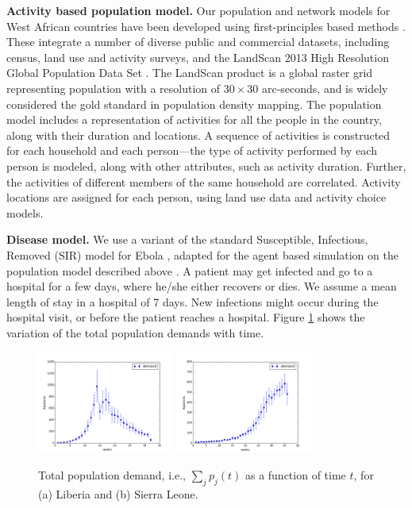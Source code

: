 \noindent
\textbf{Activity based population model.}
Our population and network models for West African countries
have been developed using first-principles based methods \cite{barrett:wsc09,eubank:nature04}.
These integrate a number of diverse public and commercial datasets, including census, 
land use and activity surveys, and the LandScan 2013 High Resolution Global Population Data Set \cite{LandScan}.
The LandScan product is a global raster grid representing population with a resolution of 
$30 \times 30$ arc-seconds, and is widely considered the gold standard in population density mapping. 
The population model includes a representation of activities for all the people in the country,
along with their duration and locations. 
A sequence of activities is constructed for each household and each person---the type of activity 
performed by each person is modeled, along with other attributes,
such as activity duration. Further, the activities of different members of the same household are correlated.
Activity locations are assigned for each person, using land use data and activity choice models.

\noindent
\textbf{Disease model.}
We use a variant of the standard Susceptible, Infectious, Removed (SIR) model for 
Ebola \cite{legrand_grais_boelle_valleron_flahault_2007}, adapted for the 
agent based simulation on the population model described above \cite{rivers:2014ea}.
A patient may get infected and go to a hospital for a few days, where he/she either recovers or dies.
We assume a mean length of stay in a hospital of 7 days. New infections might occur during
the hospital visit, or before the patient reaches a hospital. 
Figure \ref{fig:demand-dist} shows the variation of the total population demands with time.


\begin{figure}
\centering %
\includegraphics[width=0.4\textwidth]{figs/plot_demand.png}
\includegraphics[width=0.4\textwidth]{figs/plot_demand_SL.png}
\caption{Total population demand, i.e., $\sum_j p_j(t)$ as a function of time $t$, for
(a) Liberia and (b) Sierra Leone.}
\label{fig:demand-dist}
\end{figure}

